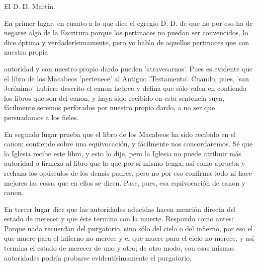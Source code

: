 El D. D. Martín.

En primer lugar, en cuanto a lo que dice el egregio D. D. de que no por eso ha de negarse algo de la Escritura porque los pertinaces no puedan ser convencidos, lo dice óptima y verdaderísimamente, pero yo hablo de aquellos pertinaces que con nuestra propia

autoridad y con nuestro propio dardo pueden 'atravesarnos'. Pues es evidente que el libro de los Macabeos 'pertenece' al Antiguo 'Testamento'. Cuando, pues, 'san Jerónimo' hubiere descrito el canon hebreo y defina que sólo valen en contienda los libros que son del canon, y haya sido recibido en esta sentencia suya, fácilmente seremos perforados por nuestro propio dardo, a no ser que persuadamos a los fieles.

En segundo lugar prueba que el libro de los Macabeos ha sido recibido en el canon; contiende sobre una equivocación, y fácilmente nos concordaremos. Sé que la Iglesia recibe este libro, y esto lo dije, pero la Iglesia no puede atribuir más autoridad o firmeza al libro que la que por sí mismo tenga, así como aprueba y rechaza los opúsculos de los demás padres, pero no por eso confirma todo ni hace mejores las cosas que en ellos se dicen. Pase, pues, esa equivocación de canon y canon.

En tercer lugar dice que las autoridades aducidas hacen mención directa del estado de merecer y que éste termina con la muerte. Respondo como antes: Porque nada recuerdan del purgatorio, sino sólo del cielo o del infierno, por eso el que muere para el infierno no merece y el que muere para el cielo no merece, y así termina el estado de merecer de uno y otro; de otro modo, con esas mismas autoridades podría probarse evidentísimamente el purgatorio.

